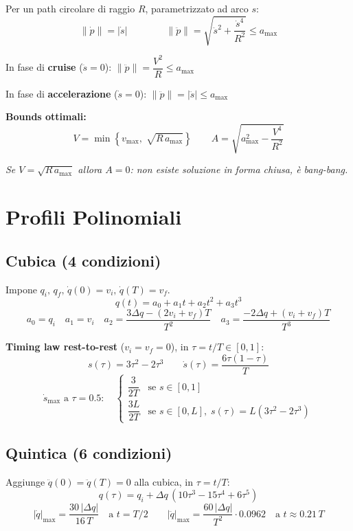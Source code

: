 \documentclass[10pt,a4paper]{article}
\newcommand{\dt}{\dot{s}}
\newcommand{\ddt}{\ddot{s}}
\begin{document}
\begin{greenbox}
Per un path circolare di raggio $R$, parametrizzato ad arco $s$:
\[
\|\dot{p}\| = |\dt| \qquad\qquad
\|\ddot{p}\| = \sqrt{\ddt^2 + \frac{\dt^4}{R^2}} \leq a_{\max}
\]

In fase di \textbf{cruise} ($\ddt = 0$): \quad $\|\ddot{p}\| = \dfrac{V^2}{R} \leq a_{\max}$

In fase di \textbf{accelerazione} ($\dt = 0$): \quad $\|\ddot{p}\| = |\ddt| \leq a_{\max}$

\medskip
\textbf{Bounds ottimali:}
\[
V = \min\!\left\{v_{\max},\; \sqrt{R\,a_{\max}}\right\}
\qquad
A = \sqrt{a_{\max}^2 - \frac{V^4}{R^2}}
\]

\textit{Se $V = \sqrt{R\,a_{\max}}$ allora $A = 0$: non esiste soluzione in forma chiusa, \`e bang-bang.}
\end{greenbox}

\newpage
\section{Profili Polinomiali}

\subsection{Cubica (4 condizioni)}

Impone $q_i,\, q_f,\, \dot{q}(0) = v_i,\, \dot{q}(T) = v_f$.
\[
q(t) = a_0 + a_1 t + a_2 t^2 + a_3 t^3
\]
\[
a_0 = q_i \quad a_1 = v_i \quad
a_2 = \frac{3\Delta q - (2v_i + v_f)T}{T^2} \quad
a_3 = \frac{-2\Delta q + (v_i + v_f)T}{T^3}
\]

\textbf{Timing law rest-to-rest} ($v_i = v_f = 0$), in $\tau = t/T \in [0,1]$:
\[
s(\tau) = 3\tau^2 - 2\tau^3 \qquad \dot{s}(\tau) = \frac{6\tau(1-\tau)}{T}
\]
\[
\dot{s}_{\max} \text{ a } \tau=0.5:\quad
\begin{cases}
\dfrac{3}{2T} & \text{se } s\in[0,1] \\[6pt]
\dfrac{3L}{2T} & \text{se } s\in[0,L],\; s(\tau)=L(3\tau^2-2\tau^3)
\end{cases}
\]

\subsection{Quintica (6 condizioni)}

Aggiunge $\ddot{q}(0) = \ddot{q}(T) = 0$ alla cubica, in $\tau = t/T$:
\[
q(\tau) = q_i + \Delta q\,(10\tau^3 - 15\tau^4 + 6\tau^5)
\]
\[
|\dot{q}|_{\max} = \frac{30\,|\Delta q|}{16\,T} \quad \text{a } t = T/2
\qquad
|\ddot{q}|_{\max} = \frac{60\,|\Delta q|}{T^2}\cdot 0.0962 \quad \text{a } t \approx 0.21\,T
\]
\end{document}
